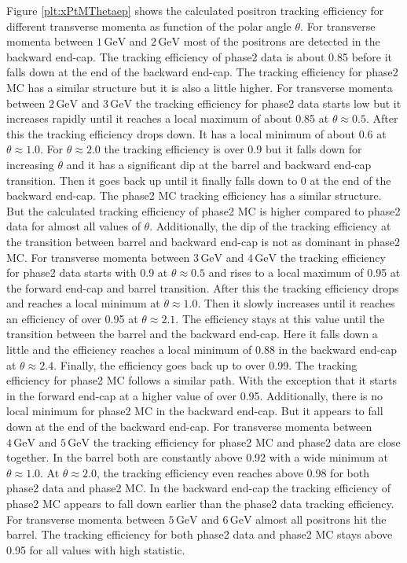 \documentclass[a4paper,11pt,twosided,final,german,openbib,pdftex,listof=totoc,bibliography=totoc]{scrbook}
\begin{document}
Figure \ref{plt:xPtMThetaep} shows the calculated positron tracking efficiency for different transverse momenta as function of the polar angle $\theta$. For transverse momenta between $1\,\textrm{GeV}$ and $2\,\textrm{GeV}$ most of the positrons are detected in the backward end-cap. The tracking efficiency of phase2 data is about 0.85 before it falls down at the end of the backward end-cap. The tracking efficiency for phase2 MC has a similar structure but it is also a little higher.
For transverse momenta between $2\,\textrm{GeV}$ and $3\,\textrm{GeV}$ the tracking efficiency for phase2 data starts low  but it increases rapidly until it reaches a local maximum of about 0.85 at $\theta \approx 0.5$. After this the tracking efficiency drops down. It has a local minimum of about 0.6 at $\theta \approx 1.0$. For $\theta \approx 2.0$ the tracking efficiency is over 0.9 but it falls down for increasing $\theta$ and it has a significant dip at the barrel and backward end-cap transition. Then it goes back up until it finally falls down to 0 at the end of the backward end-cap. The phase2 MC tracking efficiency has a similar structure. But the calculated tracking efficiency of phase2 MC is higher compared to phase2 data for almost all values of $\theta$. Additionally, the dip of the tracking efficiency at the transition between barrel and backward end-cap is not as dominant in phase2 MC.
For transverse momenta between $3\,\textrm{GeV}$ and $4\,\textrm{GeV}$ the tracking efficiency for phase2 data starts with 0.9 at $\theta \approx 0.5$ and rises to a local maximum of 0.95 at the forward end-cap and barrel transition. After this the tracking efficiency drops and reaches a local minimum at $\theta \approx 1.0$. Then it slowly increases until it reaches an efficiency of over 0.95 at $\theta \approx 2.1$. The efficiency stays at this value until the transition between the barrel and the backward end-cap. Here it falls down a little and the efficiency reaches a local minimum of 0.88 in the backward end-cap at $\theta \approx 2.4$. Finally, the efficiency goes back up to over 0.99. The tracking efficiency for phase2 MC follows a similar path. With the exception that it starts in the forward end-cap at a higher value of over 0.95. Additionally, there is no local minimum for phase2 MC in the backward end-cap. But it appears to fall down at the end of the backward end-cap.
For transverse momenta between $4\,\textrm{GeV}$  and $5\,\textrm{GeV}$ the tracking efficiency for phase2 MC and phase2 data are close together. In the barrel both are constantly above 0.92 with a wide minimum at $\theta \approx 1.0$. At $\theta \approx 2.0$, the tracking efficiency even reaches above 0.98 for both phase2 data and phase2 MC. In the backward end-cap the tracking efficiency of phase2 MC appears to fall down earlier than the phase2 data tracking efficiency.
For transverse momenta between $5\,\textrm{GeV}$ and $6\,\textrm{GeV}$ almost all positrons hit the barrel. The tracking efficiency for both phase2 data and phase2 MC stays above 0.95 for all values with high statistic.
\end{document}
